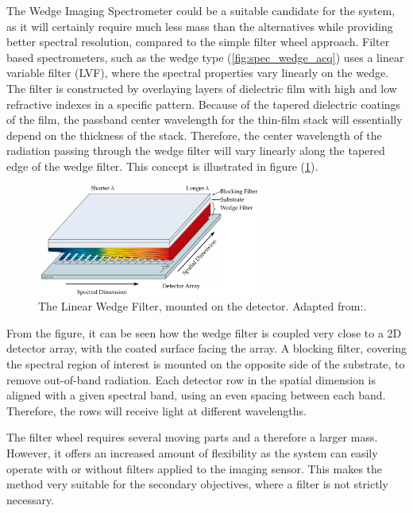 The Wedge Imaging Spectrometer could be a suitable candidate for the system, as it will certainly require much less mass than the alternatives while providing better spectral resolution, compared to the simple filter wheel approach. Filter based spectrometers, such as the wedge type (\ref{fig:spec_wedge_acq}) uses a linear variable filter (LVF), where the spectral properties vary linearly on the wedge\cite{joseph2015building}. The filter is constructed by overlaying layers of dielectric film with high and low refractive indexes in a specific pattern. Because of the tapered dielectric coatings of the film, the passband center wavelength for the thin-film stack will essentially depend on the thickness of the stack. Therefore, the center wavelength of the radiation passing through the wedge filter will vary linearly along the tapered edge of the wedge filter\cite{joseph2015building}. This concept is illustrated in figure (\ref{fig:spec_wedge2}).

\begin{figure}[htb]
\centering
\includegraphics[width=0.65\textwidth]{figures/Orbiter/spectrometer_wedge_3}
\caption{The Linear Wedge Filter, mounted on the detector. Adapted from:\cite{puschell1999a}.}
\label{fig:spec_wedge2}
\end{figure}

From the figure, it can be seen how the wedge filter is coupled very close to a 2D detector array, with the coated surface facing the array. A blocking filter, covering the spectral region of interest is mounted on the opposite side of the substrate, to remove out-of-band radiation. Each detector row in the spatial dimension is aligned with a given spectral band, using an even spacing between each band. Therefore, the rows will receive light at different wavelengths.

The filter wheel requires several moving parts and a therefore a larger mass. However, it offers an increased amount of flexibility as the system can easily operate with or without filters applied to the imaging sensor. This makes the method very suitable for the secondary objectives, where a filter is not strictly necessary.

